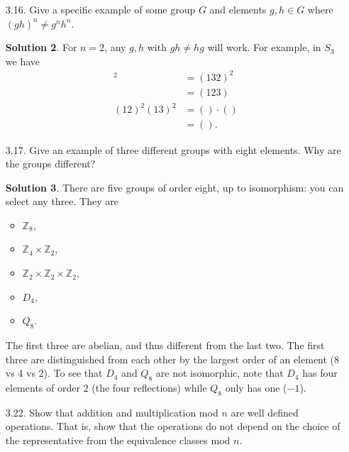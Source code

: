 \documentclass{article}
\newcommand{\RR}{\mathbb{R}}
\newcommand{\ZZ}{\mathbb{Z}}
\theoremstyle{definition}
\newtheorem*{solution}{Solution}
\begin{document}
\begin{enumerate}
\begin{solution}
\begin{itemize}
\begin{align*}
a * \frac{-a}{1+a} &= a + \frac{-a}{1+a} + \frac{-a^2}{1+a} = 0 \\
\frac{-a}{1+a} * a &= \frac{-a}{1+a} + a + \frac{-a^2}{1+a} = 0 \\
\end{align*}
\item Finally, note that $a * b = a + b + ab = b*a$ since addition and multiplication are commutative in $\RR$.
\end{itemize}
Thus $(S, *)$ is an abelian group. \qed
\end{solution}
\item[3.16.] Give a specific example of some group $G$ and elements $g,h \in G$ where $(gh)^n \ne g^nh^n$.
\begin{solution}
For $n=2$, any $g,h$ with $gh \ne hg$ will work.  For example, in $S_3$ we have
\begin{align*}
[(12)(13)]^2 &= (132)^2 \\
&= (123) \\
(12)^2(13)^2 &= () \cdot () \\
&= ().
\end{align*}
\end{solution}
\item[3.17.] Give an example of three different groups with eight elements.  Why are the groups different?
\begin{solution}
There are five groups of order eight, up to isomorphism: you can select any three.  They are
\begin{itemize}
\item $\ZZ_8$,
\item $\ZZ_4 \times \ZZ_2$,
\item $\ZZ_2 \times \ZZ_2 \times \ZZ_2$,
\item $D_4$,
\item $Q_8$.
\end{itemize}
The first three are abelian, and thus different from the last two.  The first three are distinguished from each other by the largest order of an element (8 vs 4 vs 2).  To see that $D_4$ and $Q_8$ are not isomorphic, note that $D_4$ has four elements of order $2$ (the four reflections) while $Q_8$ only has one ($-1$).  
\end{solution}
\item[3.22.] Show that addition and multiplication mod $n$ are well defined operations.  That is, show that the operations do not depend on the choice of the representative from the equivalence classes mod $n$.

\end{enumerate}
\end{document}
